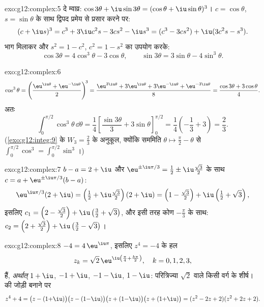 \begin{solution}{exo:g12:complex:5}
दे म्वाव्र: $\cos3\theta + \iu\sin3\theta = (\cos\theta + \iu\sin\theta)^3$। $c = \cos\theta$, $s = \sin\theta$ के साथ द्विपद प्रमेय से प्रसार करने पर:
\[
(c + \iu s)^3 = c^3 + 3\iu c^2 s - 3 c s^2 - \iu s^3
= (c^3 - 3cs^2) + \iu(3c^2 s - s^3).
\]
भाग मिलाकर और $s^2 = 1 - c^2$, $c^2 = 1 - s^2$ का उपयोग करके:
\[
\cos3\theta = 4\cos^3\theta - 3\cos\theta,
\qquad
\sin3\theta = 3\sin\theta - 4\sin^3\theta .
\]
\end{solution}

\begin{solution}{exo:g12:complex:6}
\[
\cos^3\theta = \left(\frac{\eu^{\iu\theta} + \eu^{-\iu\theta}}{2}\right)^{\!3}
= \frac{\eu^{3\iu\theta} + 3\eu^{\iu\theta} + 3\eu^{-\iu\theta} + \eu^{-3\iu\theta}}{8}
= \frac{\cos3\theta + 3\cos\theta}{4}.
\]
अतः
\[
\int_0^{\pi/2}\cos^3\theta\,\dd\theta
= \frac14\left[\frac{\sin3\theta}{3} + 3\sin\theta\right]_0^{\pi/2}
= \frac14\left(-\frac13 + 3\right) = \frac{2}{3}.
\]
(\cref{exo:g12:integ:9} के $W_3 = \frac23$ के अनुकूल, क्योंकि सममिति $\theta \mapsto \frac\pi2 - \theta$ से $\int_0^{\pi/2}\cos^3 = \int_0^{\pi/2}\sin^3$।)
\end{solution}

\begin{solution}{exo:g12:complex:7}
$b - a = 2 + \iu$ और $\eu^{\pm\iu\pi/3} = \frac12 \pm \iu\frac{\sqrt3}{2}$ के साथ $c = a + \eu^{\pm\iu\pi/3}(b - a)$:
\[
\eu^{\iu\pi/3}(2+\iu) = \left(\tfrac12 + \iu\tfrac{\sqrt3}{2}\right)(2+\iu)
= \left(1 - \tfrac{\sqrt3}{2}\right) + \iu\left(\tfrac12 + \sqrt3\right),
\]
इसलिए $c_1 = \left(2 - \frac{\sqrt3}{2}\right) +
\iu\left(\frac32 + \sqrt3\right)$, और इसी तरह कोण $-\frac\pi3$ के साथ: $c_2 = \left(2 + \frac{\sqrt3}{2}\right) + \iu\left(\frac32 - \sqrt3\right)$।
\end{solution}

\begin{solution}{exo:g12:complex:8}
$-4 = 4\,\eu^{\iu\pi}$, इसलिए $z^4 = -4$ के हल
\[
z_k = \sqrt2\,\eu^{\iu\left(\frac\pi4 + \frac{k\pi}{2}\right)},
\quad k = 0, 1, 2, 3,
\]
हैं, \emph{अर्थात्} $1 + \iu$, $-1 + \iu$, $-1 - \iu$, $1 - \iu$: परित्रिज्या $\sqrt 2$ वाले किसी वर्ग
के शीर्ष।   की जोड़ी बनाने पर
\[
z^4 + 4 = \bigl(z - (1{+}\iu)\bigr)\bigl(z - (1{-}\iu)\bigr)
\bigl(z + (1{-}\iu)\bigr)\bigl(z + (1{+}\iu)\bigr)
= (z^2 - 2z + 2)(z^2 + 2z + 2).
\]
\end{solution}

